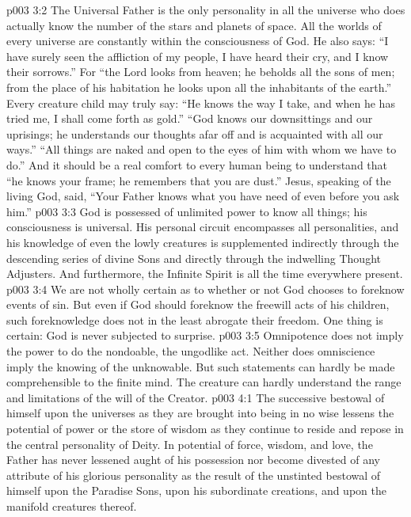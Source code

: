\vs p003 3:2 The Universal Father is the only personality in all the universe who does actually know the number of the stars and planets of space. All the worlds of every universe are constantly within the consciousness of God. He also says: “I have surely seen the affliction of my people, I have heard their cry, and I know their sorrows.” For “the Lord looks from heaven; he beholds all the sons of men; from the place of his habitation he looks upon all the inhabitants of the earth.” Every creature child may truly say: “He knows the way I take, and when he has tried me, I shall come forth as gold.” “God knows our downsittings and our uprisings; he understands our thoughts afar off and is acquainted with all our ways.” “All things are naked and open to the eyes of him with whom we have to do.” And it should be a real comfort to every human being to understand that “he knows your frame; he remembers that you are dust.” Jesus, speaking of the living God, said, “Your Father knows what you have need of even before you ask him.”
\vs p003 3:3 God is possessed of unlimited power to know all things; his consciousness is universal. His personal circuit encompasses all personalities, and his knowledge of even the lowly creatures is supplemented indirectly through the descending series of divine Sons and directly through the indwelling Thought Adjusters. And furthermore, the Infinite Spirit is all the time everywhere present.
\vs p003 3:4 We are not wholly certain as to whether or not God chooses to foreknow events of sin. But even if God should foreknow the freewill acts of his children, such foreknowledge does not in the least abrogate their freedom. One thing is certain: God is never subjected to surprise.
\vs p003 3:5 \pc Omnipotence does not imply the power to do the nondoable, the ungodlike act. Neither does omniscience imply the knowing of the unknowable. But such statements can hardly be made comprehensible to the finite mind. The creature can hardly understand the range and limitations of the will of the Creator.
\vs p003 4:1 The successive bestowal of himself upon the universes as they are brought into being in no wise lessens the potential of power or the store of wisdom as they continue to reside and repose in the central personality of Deity. In potential of force, wisdom, and love, the Father has never lessened aught of his possession nor become divested of any attribute of his glorious personality as the result of the unstinted bestowal of himself upon the Paradise Sons, upon his subordinate creations, and upon the manifold creatures thereof.
